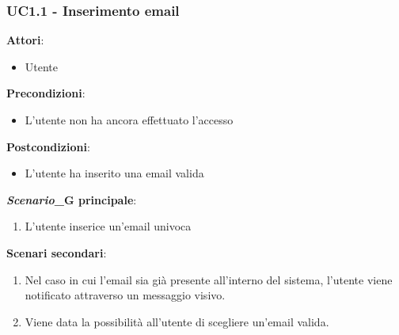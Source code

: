 \subsubsection{UC1.1 - Inserimento email}\label{usecase:1_1}
\textbf{Attori}:
\begin{itemize}
    \item Utente
\end{itemize}
\textbf{Precondizioni}:
\begin{itemize}
    \item L'utente non ha ancora effettuato l'accesso
\end{itemize}
\textbf{Postcondizioni}:
\begin{itemize}
    \item L'utente ha inserito una email valida
\end{itemize}
\textbf{\textit{Scenario}_G principale}:
\begin{enumerate}
    \item L'utente inserice un'email univoca
\end{enumerate}
\textbf{Scenari secondari}:
\begin{enumerate}
    \item Nel caso in cui l'email sia già presente all'interno del sistema, l'utente viene notificato attraverso un messaggio visivo.
    \item Viene data la possibilità all'utente di scegliere un'email valida.
\end{enumerate}
